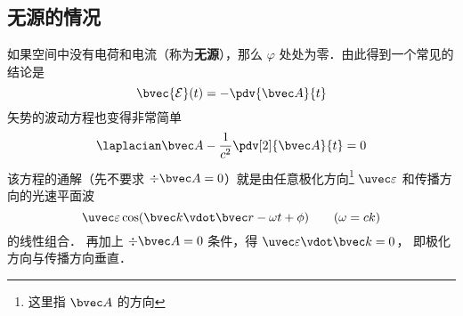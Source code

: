 \subsection{无源的情况}

如果空间中没有电荷和电流（称为\textbf{无源}），那么 $\varphi$ 处处为零．由此得到一个常见的结论是
\begin{equation}\label{Cgauge_eq2}
\bvec {\mathcal{E}}(t) = -\pdv{\bvec A}{t}
\end{equation}
矢势的波动方程也变得非常简单
\begin{equation}
\laplacian \bvec A - \frac{1}{c^2} \pdv[2]{\bvec A}{t} = 0
\end{equation}
该方程的通解（先不要求 $\div \bvec A = 0$）就是由任意极化方向\footnote{这里指 $\bvec A$ 的方向} $\uvec \varepsilon$ 和传播方向的光速平面波
\begin{equation}
\uvec \varepsilon \cos(\bvec k \vdot \bvec r - \omega t + \phi) \qquad (\omega = ck)
\end{equation}
的线性组合． 再加上 $\div \bvec A = 0$ 条件，得 $\uvec \varepsilon \vdot \bvec k = 0$， 即极化方向与传播方向垂直．
